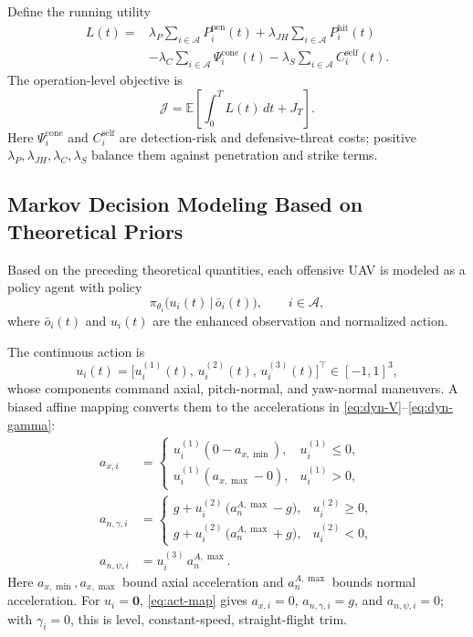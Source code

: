 \documentclass{cja}
\begin{document}
Define the running utility
\begin{equation}
\begin{aligned}
L(t)
={}&
\lambda_P \sum_{i\in\mathcal{A}} P_i^{\mathrm{pen}}(t)
+
\lambda_{JH} \sum_{i\in\mathcal{A}} P_i^{\mathrm{hit}}(t)\\
&
-
\lambda_C \sum_{i\in\mathcal{A}} \Psi_i^{\mathrm{cone}}(t)
-
\lambda_S \sum_{i\in\mathcal{A}} C_i^{\mathrm{self}}(t).
\end{aligned}
\label{eq:running-utility}
\end{equation}
The operation-level objective is
\begin{equation}
\mathcal J
=
\mathbb E\!\left[
\int_0^T L(t)\,dt+J_T
\right].
\end{equation}
Here $\Psi_i^{\mathrm{cone}}$ and $C_i^{\mathrm{self}}$ are detection-risk and defensive-threat costs; positive $\lambda_P,\lambda_{JH},\lambda_C,\lambda_S$ balance them against penetration and strike terms.

\subsection{Markov Decision Modeling Based on Theoretical Priors}
\label{subsec:rl-design}

Based on the preceding theoretical quantities, each offensive UAV is modeled as a policy agent with policy
\begin{equation}
\pi_{\theta_i}\bigl(u_i(t)\,\big|\,\bar o_i(t)\bigr),\qquad i\in\mathcal{A},
\end{equation}
where $\bar o_i(t)$ and $u_i(t)$ are the enhanced observation and normalized action.

The continuous action is
\begin{equation}
u_i(t)=\bigl[u_i^{(1)}(t),\,u_i^{(2)}(t),\,u_i^{(3)}(t)\bigr]^{\top}\in[-1,1]^3,
\label{eq:rl-action}
\end{equation}
whose components command axial, pitch-normal, and yaw-normal maneuvers. A biased affine mapping converts them to the accelerations in \eqref{eq:dyn-V}--\eqref{eq:dyn-gamma}:
\begin{equation}
\begin{aligned}
a_{x,i}
&=
\begin{cases}
u_i^{(1)}(0-a_{x,\min}), & u_i^{(1)}\le0,\\
u_i^{(1)}(a_{x,\max}-0), & u_i^{(1)}>0,
\end{cases}\\
a_{n,\gamma,i}
&=
\begin{cases}
g+u_i^{(2)}\,\bigl(a_n^{A,\max}-g\bigr), & u_i^{(2)}\ge 0,\\[2pt]
g+u_i^{(2)}\,\bigl(a_n^{A,\max}+g\bigr), & u_i^{(2)}<0,
\end{cases}
\\
a_{n,\psi,i}
&=u_i^{(3)}\,a_n^{A,\max}.
\end{aligned}
\label{eq:act-map}
\end{equation}
Here $a_{x,\min},a_{x,\max}$ bound axial acceleration and $a_n^{A,\max}$ bounds normal acceleration. For $u_i=\mathbf0$, \eqref{eq:act-map} gives $a_{x,i}=0$, $a_{n,\gamma,i}=g$, and $a_{n,\psi,i}=0$; with $\gamma_i=0$, this is level, constant-speed, straight-flight trim.
\end{document}

